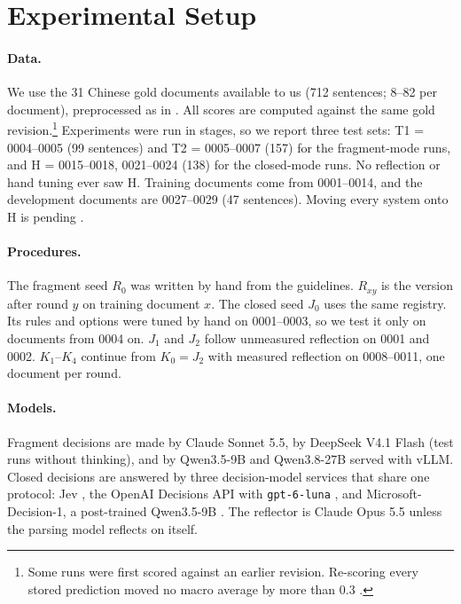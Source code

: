 \section{Experimental Setup}
\label{sec:setup}

\paragraph{Data.}
We use the 31 Chinese \umr gold documents available to us (712 sentences; 8--82 per document), preprocessed as in \citet{chun2024pipeline}. All scores are computed against the same gold revision.\footnote{Some runs were first scored against an earlier revision. Re-scoring every stored prediction moved no macro average by more than 0.3 \F.} Experiments were run in stages, so we report three test sets: T1 = 0004--0005 (99 sentences) and T2 = 0005--0007 (157) for the fragment-mode runs, and H = 0015--0018, 0021--0024 (138) for the closed-mode runs. No reflection or hand tuning ever saw H. Training documents come from 0001--0014, and the development documents are 0027--0029 (47 sentences). Moving every system onto H is pending .

\paragraph{Procedures.}
The fragment seed $R_0$ was written by hand from the \umr guidelines. $R_{xy}$ is the version after round $y$ on training document $x$. The closed seed $J_0$ uses the same registry. Its rules and options were tuned by hand on 0001--0003, so we test it only on documents from 0004 on. $J_1$ and $J_2$ follow unmeasured reflection on 0001 and 0002. $K_1$--$K_4$ continue from $K_0=J_2$ with measured reflection on 0008--0011, one document per round.

\paragraph{Models.}
Fragment decisions are made by Claude Sonnet 5.5, by DeepSeek V4.1 Flash (test runs without thinking), and by Qwen3.5-9B and Qwen3.8-27B \citep{qwen3} served with vLLM. Closed decisions are answered by three decision-model services that share one protocol: Jev \citep{typesafe2026jev}, the OpenAI Decisions API with \texttt{gpt-6-luna} \citep{openai2026decisions}, and Microsoft-Decision-1, a post-trained Qwen3.5-9B \citep{microsoft2026decision}. The reflector is Claude Opus 5.5 unless the parsing model reflects on itself.

